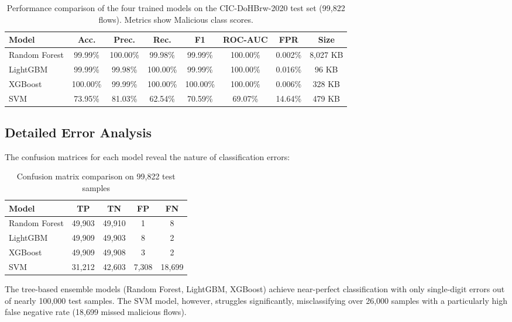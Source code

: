 \documentclass[../Main.tex]{subfiles}
\begin{document}
\begin{table}[H]
\centering
\small
\begin{tabular}{|l|c|c|c|c|c|c|c|}
\hline
\textbf{Model} & \textbf{Acc.} & \textbf{Prec.} & \textbf{Rec.} & \textbf{F1} & \textbf{ROC-AUC} & \textbf{FPR} & \textbf{Size} \\
\hline
Random Forest & 99.99\% & 100.00\% & 99.98\% & 99.99\% & 100.00\% & 0.002\% & 8,027 KB \\
LightGBM      & 99.99\% & 99.98\%  & 100.00\% & 99.99\% & 100.00\% & 0.016\% & 96 KB    \\
XGBoost       & 100.00\%& 99.99\%  & 100.00\% & 100.00\%& 100.00\% & 0.006\% & 328 KB   \\
SVM           & 73.95\% & 81.03\%  & 62.54\%  & 70.59\% & 69.07\%  & 14.64\% & 479 KB   \\
\hline
\end{tabular}
\caption{Performance comparison of the four trained models on the CIC-DoHBrw-2020 test set (99,822 flows). Metrics show Malicious class scores.}
\label{tab:model_comparison}
\end{table}

\subsection{Detailed Error Analysis}
\label{section:4.6.4}

The confusion matrices for each model reveal the nature of classification errors:

\begin{table}[H]
\centering
\small
\begin{tabular}{|l|c|c|c|c|}
\hline
\textbf{Model} & \textbf{TP} & \textbf{TN} & \textbf{FP} & \textbf{FN} \\
\hline
Random Forest & 49,903 & 49,910 & 1 & 8 \\
LightGBM      & 49,909 & 49,903 & 8 & 2 \\
XGBoost       & 49,909 & 49,908 & 3 & 2 \\
SVM           & 31,212 & 42,603 & 7,308 & 18,699 \\
\hline
\end{tabular}
\caption{Confusion matrix comparison on 99,822 test samples}
\label{tab:confusion_matrices}
\end{table}

The tree-based ensemble models (Random Forest, LightGBM, XGBoost) achieve near-perfect classification with only single-digit errors out of nearly 100,000 test samples. The SVM model, however, struggles significantly, misclassifying over 26,000 samples with a particularly high false negative rate (18,699 missed malicious flows).
\end{document}
